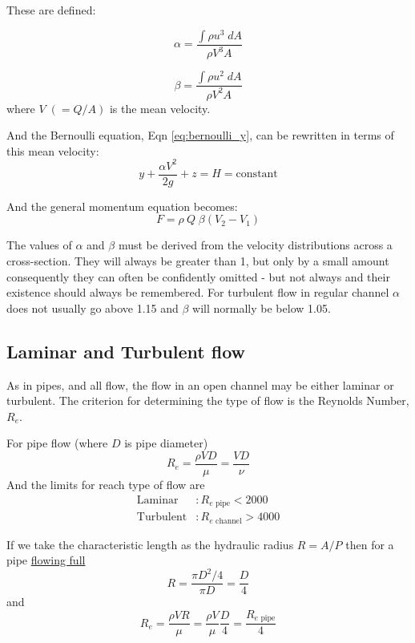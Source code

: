 \documentclass[a4paper, 12pt, british]{article} %
\numberwithin{equation}{section}
\numberwithin{figure}{section}
\numberwithin{table}{section}
\begin{document}
These are defined:

\begin{equation}
\alpha = \frac{\int \rho u^3 \; dA}{\rho V^3 A}
\label{eq:alpha}
\end{equation} 


 \begin{equation}
 \beta = \frac{\int \rho u^2 \; dA}{\rho V^2 A}
 \label{eq:beta}
 \end{equation} 
where $V \; (=Q/A)$ is the mean velocity.

And the Bernoulli equation, Eqn \ref{eq:bernoulli_y}, can be rewritten in terms of this mean velocity:
 \begin{equation}
y  + \frac{ \alpha V^2}{2g} + z  = H = \text{constant}
\label{eq:bernoulli_V}
\end{equation}
 

And the general momentum equation becomes:
 \begin{equation}
 F = \rho \:  Q \; \beta(V_{2} - V_{1})
 \label{eq:momentum_gen}
 \end{equation}


The values of $\alpha$ and $\beta$ must be derived from the velocity distributions across a cross-section. They will always be greater than 1, but only by a small amount consequently they can often be confidently omitted - but not always and their existence should always be remembered. For turbulent flow in regular channel $\alpha$ does not usually go above 1.15 and $\beta$ will normally be below 1.05. 

\subsection{Laminar and Turbulent flow}

As in pipes, and all flow, the flow in an open channel may be either laminar or turbulent. The criterion for determining the type of flow is the Reynolds Number, $R_e$.

For pipe flow (where $D$ is pipe diameter)
\begin{equation}
R_e = \frac{\rho V D}{\mu} = \frac{VD}{\nu}
\label{eq:re}
\end{equation} 
And the limits for reach type of flow are
\begin{align*}
\text{Laminar}&:  R_{e \text{ pipe}} < 2000 \\
\text{Turbulent}&:  R_{e \text{ channel}} > 4000
\end{align*}

If we take the characteristic length as the hydraulic radius $R = A/P$ then for a pipe \underline{flowing full} 
\begin{equation*}
R = \frac{\pi D^2/4}{\pi D}=\frac{D}{4} 
\end{equation*}
and
\begin{equation}
R_e = \frac{\rho V R}{\mu}=\frac{\rho V}{\mu}\frac{D}{4} = \frac{R_{e  \text{ pipe}}}{4} 
\end{equation}
\end{document}
